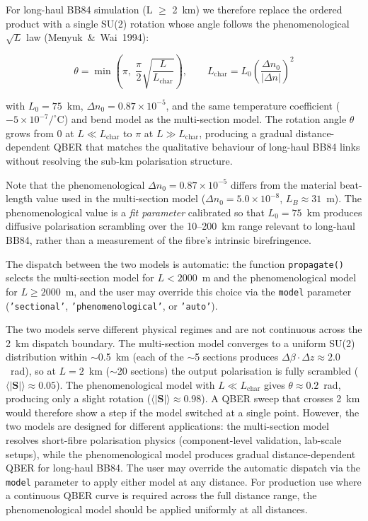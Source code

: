 \documentclass[3p,times,preprint]{elsarticle}
\begin{document}
For long-haul BB84 simulation (L $\ge$ 2~km) we therefore replace
the ordered product with a single SU(2) rotation whose angle
follows the phenomenological $\sqrt{L}$ law
(Menyuk~\&~Wai~1994):

\begin{equation}
  \theta = \min\!\left(\pi,\; \frac{\pi}{2}\sqrt{\frac{L}{L_{\text{char}}}}\right),\qquad
  L_{\text{char}} = L_0 \left(\frac{\Delta n_0}{|\Delta n|}\right)^2
  \label{eq:biref-phenom}
\end{equation}

with $L_0 = 75$~km, $\Delta n_0 = 0.87\times10^{-5}$, and the same
temperature coefficient ($-5\times10^{-7}/^\circ$C) and bend model
as the multi-section model.  The rotation angle $\theta$ grows
from 0 at $L \ll L_{\text{char}}$ to $\pi$ at $L \gg L_{\text{char}}$,
producing a gradual distance-dependent QBER that matches the
qualitative behaviour of long-haul BB84 links without resolving
the sub-km polarisation structure.

Note that the phenomenological $\Delta n_0 = 0.87\times10^{-5}$
differs from the material beat-length value used in the multi-section
model ($\Delta n_0 = 5.0\times10^{-8}$, $L_B \approx 31$~m).
The phenomenological value is a \emph{fit parameter} calibrated so
that $L_0 = 75$~km produces diffusive polarisation scrambling over
the 10--200~km range relevant to long-haul BB84, rather than a
measurement of the fibre's intrinsic birefringence.

The dispatch between the two models is automatic: the function
\texttt{propagate()} selects the multi-section model for
$L < 2000$~m and the phenomenological model for $L \ge 2000$~m,
and the user may override this choice via the \texttt{model}
parameter (\texttt{'sectional'}, \texttt{'phenomenological'},
or \texttt{'auto'}).

The two models serve different physical regimes and are not
continuous across the 2~km dispatch boundary.  The multi-section
model converges to a uniform SU(2) distribution within
$\sim$0.5~km (each of the $\sim$5 sections produces
$\Delta\beta\cdot\Delta z \approx 2.0$~rad), so at
$L = 2$~km ($\sim$20 sections) the output polarisation is fully
scrambled ($\langle|\mathbf{S}|\rangle \approx 0.05$).
The phenomenological model with $L \ll L_{\text{char}}$ gives
$\theta \approx 0.2$~rad, producing only a slight rotation
($\langle|\mathbf{S}|\rangle \approx 0.98$).  A QBER sweep that
crosses 2~km would therefore show a step if the model switched
at a single point.  However, the two models are designed for
different applications: the multi-section model resolves
short-fibre polarisation physics (component-level validation,
lab-scale setups), while the phenomenological model produces
gradual distance-dependent QBER for long-haul BB84.  The user
may override the automatic dispatch via the \texttt{model}
parameter to apply either model at any distance.  For production
use where a continuous QBER curve is required across the full
distance range, the phenomenological model should be applied
uniformly at all distances.
\end{document}
